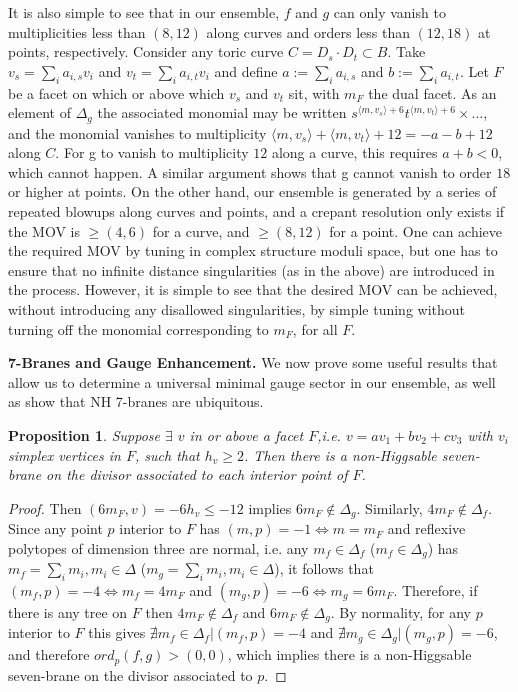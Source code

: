 \documentclass[aps,prl,twocolumn, superscriptaddress,groupedaddress,nofootinbib]{revtex4-1}
\newtheorem{prop}{Proposition}
\newcommand{\vev}[1]{\langle #1 \rangle}
\begin{document}
It is also simple to see that in our ensemble, $f$ and $g$ can only vanish to multiplicities less than $(8,12)$ along curves and orders less than $(12,18)$ at points, respectively. Consider any toric curve $C=D_s\cdot D_t \subset B$. Take $v_s=\sum_i a_{i,s} v_i$ and $v_t=\sum_i a_{i,t} v_i$ and define $a:=\sum_i a_{i,s}$ and $b:=\sum_i a_{i,t}$. Let $F$ be a facet
on which or above which $v_s$ and $v_t$ sit, with $m_F$ the dual facet. As an
element of $\Delta_g$ the associated monomial may be written
$s^{\vev{m,v_s}+6}t^{\vev{m,v_t}+6}\times \dots$,
and the monomial vanishes to multiplicity $\vev{m,v_s}+\vev{m,v_t}+12=-a-b+12$ along $C$. For g to vanish to multiplicity $12$ along a curve, this requires $a+ b <0$, which cannot happen. A similar argument shows that g cannot vanish to order $18$ or higher at points.
On the other hand, our ensemble is generated by a series of repeated blowups along curves and points, and a crepant resolution only exists if the MOV is $\geq (4,6)$ for a curve, and $\geq (8,12)$  for a point. One can achieve the required MOV by tuning in complex structure moduli space, but one has to ensure that no infinite distance singularities (as in the above) are introduced in the process. However, it is simple to see that the desired MOV can be achieved, without introducing any disallowed singularities, by simple tuning without turning off the monomial corresponding to $m_F$, for all $F$. 





\vspace{.2cm}
\noindent \textbf{7-Branes and Gauge Enhancement.}
We now prove some useful results that allow us to determine a universal minimal gauge sector in our ensemble, as well as show that NH 7-branes are ubiquitous.
\begin{prop}
\label{prop:NH7fromsingletree}
Suppose $\exists$ $v$ in or above a facet $F$,i.e. $v=av_1+bv_2+cv_3$ with $v_i$ simplex vertices in $F$, such that $h_v\geq 2$. Then there is a non-Higgsable seven-brane on the divisor associated
to each interior point of $F$.
\end{prop}

\begin{proof}
Then $(6 m_F,v)=-6h_v \leq -12$ implies $6m_F \notin \Delta_g$.
Similarly, $4m_F \notin \Delta_f$. Since any point $p$ interior to $F$ has 
$(m,p)=-1 \iff m=m_F$ and reflexive polytopes of dimension three
are normal, i.e. any $m_f\in \Delta_f$ ($m_f \in \Delta_g$) has
$m_f = \sum_i m_i, m_i\in \Delta$ ($m_g = \sum_i m_i, m_i\in \Delta$),
it follows that $(m_f,p)=-4 \iff m_f = 4m_F$ and $(m_g,p)=-6 \iff m_g = 6m_F$. Therefore, if there is any tree on $F$
then $4m_F \notin \Delta_f$ and $6m_F\notin \Delta_g$. By normality,
for any $p$ interior to $F$ this gives
$\nexists m_f \in \Delta_f | (m_f,p)=-4$ and
$\nexists m_g \in \Delta_g | (m_g,p)=-6$, and therefore $ord_p(f,g) > (0,0)$,
which implies there is a non-Higgsable seven-brane on the divisor associated to $p$.
\end{proof}
\end{document}
